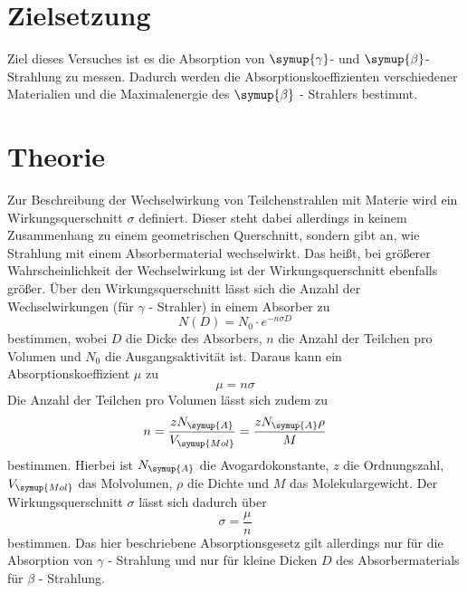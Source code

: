\section{Zielsetzung}
    Ziel dieses Versuches ist es die Absorption von $\symup{\gamma}$- und $\symup{\beta}$- Strahlung zu messen. Dadurch werden die 
    Absorptionskoeffizienten verschiedener Materialien und die Maximalenergie des $\symup{\beta}$ - Strahlers bestimmt.


\section{Theorie}
\label{sec:Theorie}
Zur Beschreibung der Wechselwirkung von Teilchenstrahlen mit Materie wird ein Wirkungsquerschnitt $\sigma$ definiert. Dieser steht dabei allerdings in 
keinem Zusammenhang zu einem geometrischen Querschnitt, sondern gibt an, wie Strahlung mit einem Absorbermaterial wechselwirkt. Das heißt, bei größerer
Wahrscheinlichkeit der Wechselwirkung ist der Wirkungsquerschnitt ebenfalls größer.
Über den Wirkungsquerschnitt
lässt sich die Anzahl der Wechselwirkungen (für $\gamma$ - Strahler) in einem Absorber zu 
\begin{equation}
    \label{eqn:absorp}
    N(D) = N_0 \cdot e^{-n \sigma D}
\end{equation}
bestimmen, wobei $D$ die Dicke des Absorbers, $n$ die Anzahl der Teilchen pro Volumen und $N_0$ die Ausgangsaktivität ist.
Daraus kann ein Absorptionskoeffizient $\mu$ zu 
\begin{equation}
    \label{eqn:mu}
    \mu = n \sigma
\end{equation}
Die Anzahl der 
Teilchen pro Volumen lässt sich zudem zu 
\begin{equation}
    \label{eqn:anzahl_teilchen}
        n = \frac{z N_{\symup{A}}}{V_{\symup{Mol}}} = \frac{z N_{\symup{A}} \rho}{M}
\end{equation}
bestimmen. Hierbei ist $N_{\symup{A}}$ die Avogardokonstante, $z$ die Ordnungszahl, $V_{\symup{Mol}}$ das Molvolumen, $\rho$ die Dichte und $M$
das Molekulargewicht.
Der Wirkungsquerschnitt $\sigma$ lässt sich dadurch über 
\begin{equation}
    \label{eqn:wirkungsquerschnitt}
    \sigma = \frac{\mu}{n}
\end{equation}
bestimmen. Das hier beschriebene Absorptionsgesetz gilt allerdings nur für die Absorption von $\gamma$ - Strahlung und nur für kleine Dicken $D$ des
Absorbermaterials für $\beta$ - Strahlung.
